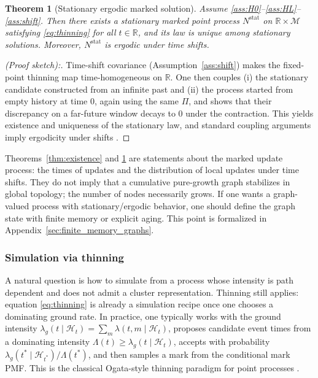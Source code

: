 \documentclass[12pt]{article}
\newtheorem{theorem}{Theorem}[section]
\begin{document}
\begin{theorem}[Stationary ergodic marked solution]\label{thm:stationary}
Assume \ref{ass:H0}--\ref{ass:HL}--\ref{ass:shift}. Then there exists a stationary marked point process $N^{\mathrm{stat}}$ on $\mathbb R\times\mathcal M$ satisfying \eqref{eq:thinning} for all $t\in\mathbb R$, and its law is unique among stationary solutions. Moreover, $N^{\mathrm{stat}}$ is ergodic under time shifts.
\end{theorem}

\begin{proof}[(Proof sketch):] Time-shift covariance (Assumption~\ref{ass:shift}) makes the fixed-point thinning map time-homogeneous on $\mathbb R$. One then couples (i) the stationary candidate constructed from an infinite past and (ii) the process started from empty history at time $0$, again using the same $\Pi$, and shows that their discrepancy on a far-future window decays to $0$ under the contraction. This yields existence and uniqueness of the stationary law, and standard coupling arguments imply ergodicity under shifts \citep{bremaud1996stability}.\end{proof}

Theorems~\ref{thm:existence} and \ref{thm:stationary} are statements about the marked update process: the times of updates and the distribution of local updates under time shifts. They do not imply that a cumulative pure-growth graph stabilizes in global topology; the number of nodes necessarily grows. If one wants a graph-valued process with stationary/ergodic behavior, one should define the graph state with finite memory or explicit aging. This point is formalized in Appendix~\ref{sec:finite_memory_graphs}.

\subsubsection{Simulation via thinning}\label{sec:simulation}

A natural question is how to simulate from a process whose intensity is path dependent and does not admit a cluster representation. Thinning still applies: equation \eqref{eq:thinning} is already a simulation recipe once one chooses a dominating ground rate. In practice, one typically works with the ground intensity $\lambda_g(t\mid\mathcal H_t)=\sum_m \lambda(t,m\mid\mathcal H_t)$, proposes candidate event times from a dominating intensity $\Lambda(t)\ge \lambda_g(t\mid\mathcal H_t)$, accepts with probability $\lambda_g(t^*\mid\mathcal H_{t^*})/\Lambda(t^*)$, and then samples a mark from the conditional mark PMF. This is the classical Ogata-style thinning paradigm for point processes \citep{ogata1981lewis}.
\end{document}
